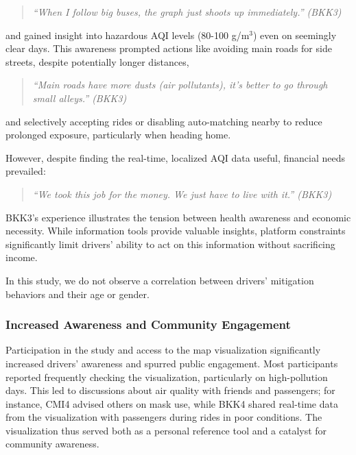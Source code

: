 \begin{quote}
  \em
    ``When I follow big buses, the graph just shoots up immediately.'' (BKK3)
\end{quote}

and gained insight into hazardous AQI levels (80-100 \textmu{}g/m$^3$) even on seemingly clear days. This awareness prompted actions like avoiding main roads for side streets, despite potentially longer distances,

\begin{quote}
  \em
    ``Main roads have more dusts (air pollutants), it’s better to go through small alleys.'' (BKK3)
\end{quote}

and selectively accepting rides or disabling auto-matching nearby to reduce prolonged exposure, particularly when heading home.


However, despite finding the real-time, localized AQI data useful, financial needs prevailed:

\begin{quote}
  \em
    ``We took this job for the money. We just have to live with it.'' (BKK3)
\end{quote}

BKK3's experience illustrates the tension between health awareness and economic necessity.
While information tools provide valuable insights, platform constraints significantly limit drivers' ability to act on this information without sacrificing income.

In this study, we do not observe a correlation between drivers' mitigation behaviors and their age or gender.

\subsubsection{Increased Awareness and Community Engagement}
Participation in the study and access to the map visualization significantly increased drivers' awareness and spurred public engagement.
Most participants reported frequently checking the visualization, particularly on high-pollution days.
This led to discussions about air quality with friends and passengers; for instance, CMI4 advised others on mask use, while BKK4 shared real-time data from the visualization with passengers during rides in poor conditions.
The visualization thus served both as a personal reference tool and a catalyst for community awareness.

